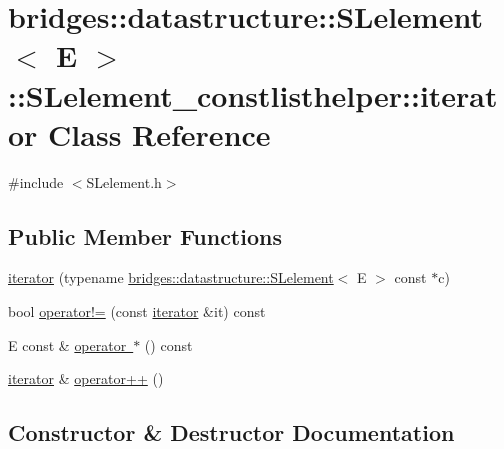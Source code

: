 \hypertarget{classbridges_1_1datastructure_1_1_s_lelement_1_1_s_lelement__constlisthelper_1_1iterator}{}\section{bridges\+::datastructure\+::S\+Lelement$<$ E $>$\+::S\+Lelement\+\_\+constlisthelper\+::iterator Class Reference}
\label{classbridges_1_1datastructure_1_1_s_lelement_1_1_s_lelement__constlisthelper_1_1iterator}


{\ttfamily \#include $<$S\+Lelement.\+h$>$}

\subsection*{Public Member Functions}
\begin{DoxyCompactItemize}
\item 
\mbox{\hyperlink{classbridges_1_1datastructure_1_1_s_lelement_1_1_s_lelement__constlisthelper_1_1iterator_a438b2bda67331a3a989ea5fa45c30f7f}{iterator}} (typename \mbox{\hyperlink{classbridges_1_1datastructure_1_1_s_lelement}{bridges\+::datastructure\+::\+S\+Lelement}}$<$ E $>$ const $\ast$c)
\item 
bool \mbox{\hyperlink{classbridges_1_1datastructure_1_1_s_lelement_1_1_s_lelement__constlisthelper_1_1iterator_a65e17e54ef5f08c3deaee084951bda6a}{operator!=}} (const \mbox{\hyperlink{classbridges_1_1datastructure_1_1_s_lelement_1_1_s_lelement__constlisthelper_1_1iterator}{iterator}} \&it) const
\item 
E const  \& \mbox{\hyperlink{classbridges_1_1datastructure_1_1_s_lelement_1_1_s_lelement__constlisthelper_1_1iterator_a202bbc30f85e1a9176f1e5ca22397154}{operator $\ast$}} () const
\item 
\mbox{\hyperlink{classbridges_1_1datastructure_1_1_s_lelement_1_1_s_lelement__constlisthelper_1_1iterator}{iterator}} \& \mbox{\hyperlink{classbridges_1_1datastructure_1_1_s_lelement_1_1_s_lelement__constlisthelper_1_1iterator_a3ae6ebe78df57195446770f1c7872fdd}{operator++}} ()
\end{DoxyCompactItemize}


\subsection{Constructor \& Destructor Documentation}
\mbox{\label{classbridges_1_1datastructure_1_1_s_lelement_1_1_s_lelement__constlisthelper_1_1iterator_a438b2bda67331a3a989ea5fa45c30f7f}} 

